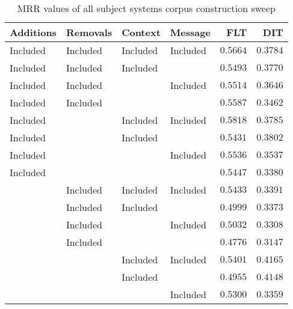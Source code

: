 
\begin{table}
\begin{spacing}{1.2}
\centering
\caption{MRR values of all subject systems corpus construction sweep}
\label{table:all_corpus_sweep}
\vspace{0.2em}
\begin{tabular}{llll|rr}
\toprule
Additions &  Removals &   Context &   Message &           FLT &           DIT \\
\midrule
 Included &  Included &  Included &  Included &      $0.5664$ &      $0.3784$ \\
 \myrowcolor Included &  Included &  Included &           &      $0.5493$ &      $0.3770$ \\
 Included &  Included &           &  Included &      $0.5514$ &      $0.3646$ \\
 Included &  Included &           &           &      $0.5587$ &      $0.3462$ \\
 Included &           &  Included &  Included & $\bm{0.5818}$ &      $0.3785$ \\
 Included &           &  Included &           &      $0.5431$ &      $0.3802$ \\
 Included &           &           &  Included &      $0.5536$ &      $0.3537$ \\
 Included &           &           &           &      $0.5447$ &      $0.3380$ \\
          &  Included &  Included &  Included &      $0.5433$ &      $0.3391$ \\
          &  Included &  Included &           &      $0.4999$ &      $0.3373$ \\
          &  Included &           &  Included &      $0.5032$ &      $0.3308$ \\
          &  Included &           &           &      $0.4776$ &      $0.3147$ \\
          &           &  Included &  Included &      $0.5401$ & $\bm{0.4165}$ \\
          &           &  Included &           &      $0.4955$ &      $0.4148$ \\
          &           &           &  Included &      $0.5300$ &      $0.3359$ \\
\bottomrule
\end{tabular}

\end{spacing}
\end{table}

